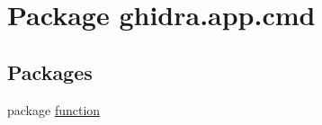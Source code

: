 \hypertarget{namespaceghidra_1_1app_1_1cmd}{}\section{Package ghidra.\+app.\+cmd}
\label{namespaceghidra_1_1app_1_1cmd}
\subsection*{Packages}
\begin{DoxyCompactItemize}
\item 
package \mbox{\hyperlink{namespaceghidra_1_1app_1_1cmd_1_1function}{function}}
\end{DoxyCompactItemize}
